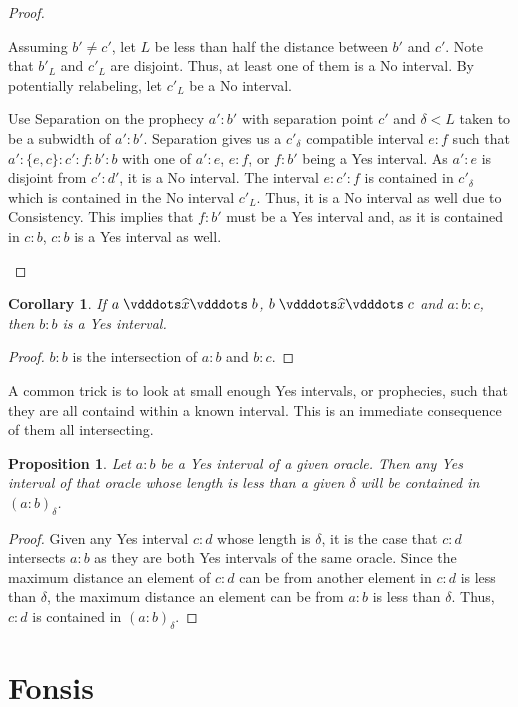 \documentclass[12pt]{article}
\newtheorem{corollary}{Corollary}[section]
\newtheorem{proposition}{Proposition}[section]
\begin{document}
\begin{proof}
\begin{enumerate}
        Assuming $b' \neq c'$, let $L$ be less than half the distance between $b'$ and $c'$. Note that $b'_L$ and $c'_L$ are disjoint. Thus, at least one of them is a No interval. By potentially relabeling, let $c'_L$ be a No interval. 

        Use Separation on the prophecy $a':b'$ with separation point $c'$ and $\delta < L$ taken to be a subwidth of $a':b'$. Separation gives us a $c'_\delta$ compatible interval $e:f$ such that $a':\{e,c\}:c':f:b':b$  with one of $a':e$, $e:f$, or $f:b'$ being a Yes interval. As $a':e$ is disjoint from $c':d'$, it is a No interval. The interval $e:c':f$ is contained in $c'_\delta$ which is contained in the No interval $c'_L$. Thus, it is a No interval as well due to Consistency. This implies that $f:b'$ must be a Yes interval and, as it is contained in $c:b$, $c:b$ is a Yes interval as well. 
     \end{enumerate}
\end{proof}

\begin{corollary}
    If $a \xora b$, $b \xora c$ and $a:b:c$, then $b:b$ is a Yes interval.
\end{corollary}

\begin{proof}
    $b:b$ is the intersection of $a:b$ and $b:c$.
\end{proof}

A common trick is to look at small enough Yes intervals, or prophecies, such that they are all containd within a known interval. This is an immediate consequence of them all intersecting. 

\begin{proposition}\label{os:yescontain}
    Let $a:b$ be a Yes interval of a given oracle. Then any Yes interval of that oracle whose length is less than a given $\delta$ will be contained in $(a:b)_\delta$.
\end{proposition}

\begin{proof}
    Given any Yes interval $c:d$ whose length is $\delta$, it is the case that $c:d$ intersects $a:b$ as they are both Yes intervals of the same oracle. Since the maximum distance an element of $c:d$ can be from another element in $c:d$ is less than $\delta$, the maximum distance an element can be from $a:b$ is less than $\delta$. Thus, $c:d$ is contained in $(a:b)_\delta$.
\end{proof}

\section{Fonsis}\label{os:fonsis}
\end{document}

